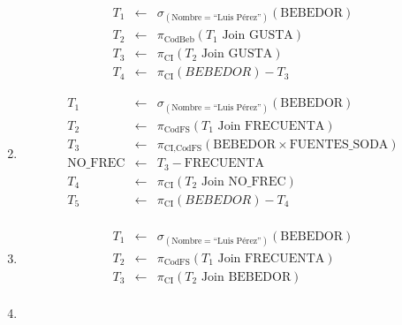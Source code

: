 \documentclass[12pt]{article}
\newcommand{\asig}{\ensuremath{\leftarrow}}
\begin{document}
\begin{enumerate}
\begin{eqnarray*}
 T_1 & \asig & \sigma_{(\text{Nombre}=\text{``Luis Pérez''})}(\text{BEBEDOR}) \\
 T_2 & \asig & \pi_{\text{CodBeb}}(T_1 \text{ Join } \text{GUSTA}) \\
 T_3 & \asig & \pi_{\text{CI}}(T_2 \text{ Join } \text{GUSTA}) \\
 T_4 & \asig & \pi_{\text{CI}}(BEBEDOR) - T_3
\end{eqnarray*}

 \item 

\begin{eqnarray*}
 T_1 & \asig & \sigma_{(\text{Nombre}=\text{``Luis Pérez''})}(\text{BEBEDOR}) \\
 T_2 & \asig & \pi_{\text{CodFS}}(T_1 \text{ Join } \text{FRECUENTA}) \\ %
 T_3 & \asig & \pi_{\text{CI,CodFS}}(\text{BEBEDOR} \times \text{FUENTES\_SODA}) \\
 \text{NO\_FREC} & \asig & T_3 - \text{FRECUENTA} \\ %
 T_4 & \asig & \pi_{\text{CI}}(T_2 \text{ Join } \text{NO\_FREC}) \\ %
 T_5 & \asig & \pi_{\text{CI}}(BEBEDOR) - T_4 \\
\end{eqnarray*}

 \item 

\begin{eqnarray*}
 T_1 & \asig & \sigma_{(\text{Nombre}=\text{``Luis Pérez''})}(\text{BEBEDOR}) \\
 T_2 & \asig & \pi_{\text{CodFS}}(T_1 \text{ Join } \text{FRECUENTA}) \\ %
 T_3 & \asig & \pi_{\text{CI}}(T_2 \text{ Join } \text{BEBEDOR}) \\
\end{eqnarray*}

 \item 


\end{enumerate}
\end{document}
